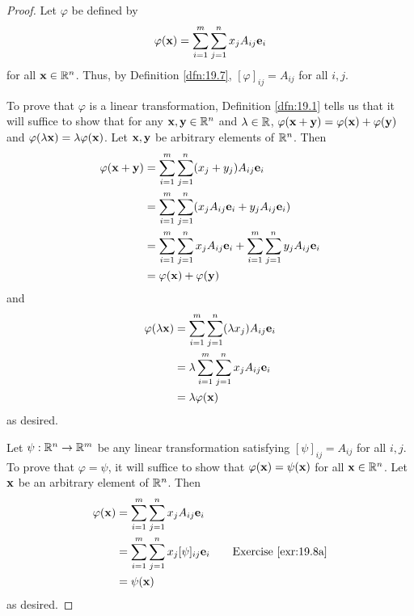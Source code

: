\documentclass[../main.tex]{subfiles}
\begin{document}
\begin{exercise}
\begin{enumerate}[label={(\alph*)},ref={\theexercise\alph*}]
        \begin{proof}
            Let $\varphi$ be defined by
            \begin{equation*}
                \varphi(\mathbf{x}) = \sum_{i=1}^m\sum_{j=1}^nx_jA_{ij}\mathbf{e}_i
            \end{equation*}
            for all $\mathbf{x}\in\mathbb{R}^n$. Thus, by Definition \ref{dfn:19.7}, $[\varphi]_{ij}=A_{ij}$ for all $i,j$.\par
            To prove that $\varphi$ is a linear transformation, Definition \ref{dfn:19.1} tells us that it will suffice to show that for any $\mathbf{x},\mathbf{y}\in\mathbb{R}^n$ and $\lambda\in\mathbb{R}$, $\varphi(\mathbf{x}+\mathbf{y})=\varphi(\mathbf{x})+\varphi(\mathbf{y})$ and $\varphi(\lambda\mathbf{x})=\lambda\varphi(\mathbf{x})$. Let $\mathbf{x},\mathbf{y}$ be arbitrary elements of $\mathbb{R}^n$. Then
            \begin{align*}
                \varphi(\mathbf{x}+\mathbf{y}) &= \sum_{i=1}^m\sum_{j=1}^n(x_j+y_j)A_{ij}\mathbf{e}_i\\
                &= \sum_{i=1}^m\sum_{j=1}^n(x_jA_{ij}\mathbf{e}_i+y_jA_{ij}\mathbf{e}_i)\\
                &= \sum_{i=1}^m\sum_{j=1}^nx_jA_{ij}\mathbf{e}_i+\sum_{i=1}^m\sum_{j=1}^ny_jA_{ij}\mathbf{e}_i\\
                &= \varphi(\mathbf{x})+\varphi(\mathbf{y})
            \end{align*}
            and
            \begin{align*}
                \varphi(\lambda\mathbf{x}) &= \sum_{i=1}^m\sum_{j=1}^n(\lambda x_j)A_{ij}\mathbf{e}_i\\
                &= \lambda\sum_{i=1}^m\sum_{j=1}^nx_jA_{ij}\mathbf{e}_i\\
                &= \lambda\varphi(\mathbf{x})
            \end{align*}
            as desired.\par
            Let $\psi:\mathbb{R}^n\to\mathbb{R}^m$ be any linear transformation satisfying $[\psi]_{ij}=A_{ij}$ for all $i,j$. To prove that $\varphi=\psi$, it will suffice to show that $\varphi(\mathbf{x})=\psi(\mathbf{x})$ for all $\mathbf{x}\in\mathbb{R}^n$. Let $\mathbf{x}$ be an arbitrary element of $\mathbb{R}^n$. Then
            \begin{align*}
                \varphi(\x) &= \sum_{i=1}^m\sum_{j=1}^nx_jA_{ij}\mathbf{e}_i\\
                &= \sum_{i=1}^m\sum_{j=1}^nx_j[\psi]_{ij}\mathbf{e}_i\tag*{Exercise \ref{exr:19.8a}}\\
                &= \psi(\x)
            \end{align*}
            as desired.
        \end{proof}
    \end{enumerate}
\end{exercise}
\end{document}
